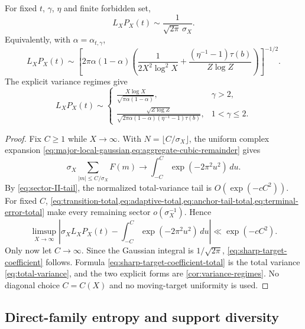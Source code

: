 \begin{theorem}
\label{thm:sharp-target-coefficient}
For fixed $t$, $\gamma$, $\eta$ and finite forbidden set,
\begin{equation}
\label{eq:sharp-target-coefficient}
 L_XP_X(t)\sim\frac1{\sqrt{2\pi}\,\sigma_X}.
\end{equation}
Equivalently, with $\alpha=\alpha_{t,\gamma}$,
\begin{equation}
\label{eq:sharp-target-coefficient-total}
 L_XP_X(t)
 \sim
 \left[
 2\pi\alpha(1-\alpha)
 \left(
  \frac1{2X^2\log^2X}
  +\frac{(\eta^{-1}-1)\tau(b)}{Z\log Z}
 \right)
 \right]^{-1/2}.
\end{equation}
The explicit variance regimes give
\begin{equation}
\label{eq:sharp-target-coefficient-regimes}
 L_XP_X(t)\sim
 \begin{cases}
 \displaystyle
 \frac{X\log X}{\sqrt{\pi\alpha(1-\alpha)}},&\gamma>2,\\[8pt]
 \displaystyle
 \frac{\sqrt{Z\log Z}}
 {\sqrt{2\pi\alpha(1-\alpha)(\eta^{-1}-1)\tau(b)}},&1<\gamma\leq2.
 \end{cases}
\end{equation}
\end{theorem}

\begin{proof}
Fix $C\geq1$ while $X\to\infty$.  With $N=\lfloor C/\sigma_X\rfloor$, the uniform complex expansion \cref{eq:major-local-gaussian,eq:aggregate-cubic-remainder} gives
\[
 \sigma_X\sum_{|m|\leq C/\sigma_X}F(m)
 \longrightarrow\int_{-C}^{C}\exp(-2\pi^2u^2)\,du.
\]
By \cref{eq:sector-II-tail}, the normalized total-variance tail is $O(\exp(-cC^2))$.  For fixed $C$, \cref{eq:transition-total,eq:adaptive-total,eq:anchor-tail-total,eq:terminal-error-total} make every remaining sector $o(\sigma_X^{-1})$.  Hence
\[
 \limsup_{X\to\infty}
 \left|\sigma_XL_XP_X(t)-
 \int_{-C}^{C}\exp(-2\pi^2u^2)\,du\right|
 \ll\exp(-cC^2).
\]
Only now let $C\to\infty$.  Since the Gaussian integral is $1/\sqrt{2\pi}$, \cref{eq:sharp-target-coefficient} follows.  Formula \cref{eq:sharp-target-coefficient-total} is the total variance \cref{eq:total-variance}, and the two explicit forms are \cref{cor:variance-regimes}.  No diagonal choice $C=C(X)$ and no moving-target uniformity is used.
\end{proof}

\subsection{Direct-family entropy and support diversity}

